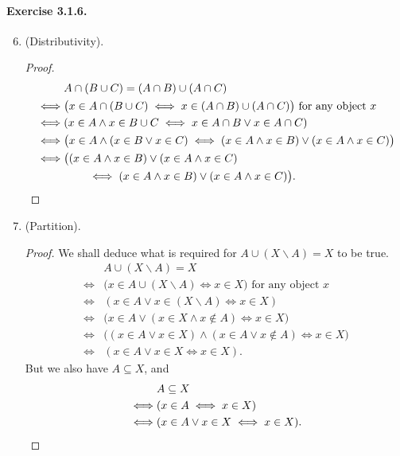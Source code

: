 \paragraph{Exercise 3.1.6.}
\begin{enumerate}\setcounter{enumi}{5}
    \item (Distributivity).
    \begin{proof}
        \begin{align*}
            &A \cap (B \cup C) = (A \cap B) \cup (A \cap C) 
            \\\iff& \big(x\in A \cap (B \cup C) \iff x\in (A \cap B) \cup (A \cap C) \big) \text{ for any object $x$}
            \\\iff& (x\in A \land x \in B \cup C \iff x \in A \cap B \lor x \in A \cap C)
            \\\iff& \big(x\in A \land (x \in B \lor x \in C) \iff (x \in A \land x \in B) \lor (x \in A \land x \in C) \big)
            \\\iff& \big( (x \in A \land x \in B) \lor (x \in A \land x \in C) 
            \\ &\qquad\iff (x \in A \land x \in B) \lor (x \in A \land x \in C) \big). \qedhere
        \end{align*}
    \end{proof}
    \item (Partition).
    \begin{proof}
        We shall deduce what is required for $A \cup (X \backslash A) = X$ to be true.
        \begin{align*}
            & A \cup (X \backslash A) = X
            \\\iff& \big( x \in A \cup (X \backslash A) \iff x \in X \big) \text{ for any object $x$}
            \\\iff& ( x \in A \lor x \in (X \backslash A) \iff x \in X )
            \\\iff& \big( x \in A \lor (x \in X \land x \notin A) \iff x \in X \big)
            \\\iff& \big( (x \in A \lor x \in X) \land (x \in A \lor x \notin A) \iff x \in X \big)
            \\\iff& ( x \in A \lor x \in X \iff x \in X ).
        \end{align*}
        But we also have $A \subseteq X$, and
        \begin{align*}
            & A \subseteq X
            \\\iff& (x \in A \iff x \in X)
            \\\iff& ( x \in A \lor x \in X \iff x \in X ). \qedhere

\end{align*}
\end{proof}
\end{enumerate}
